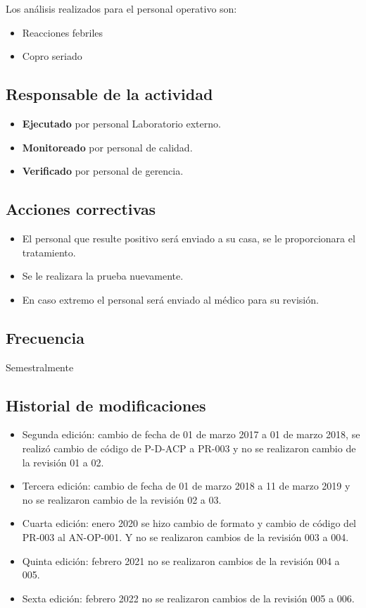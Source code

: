 Los análisis realizados para el personal operativo son:

\begin{itemize}
	\item Reacciones febriles
	\item Copro seriado
\end{itemize}

\subsection{Responsable de la actividad}
\begin{itemize}
	\item \textbf{Ejecutado} por personal Laboratorio externo.
	\item \textbf{Monitoreado} por personal de calidad.
	\item \textbf{Verificado} por personal de gerencia.
\end{itemize}

\subsection{Acciones correctivas}

\begin{itemize}
	\item El personal que resulte positivo será enviado a su casa, se le proporcionara el tratamiento.
	\item Se le realizara la prueba nuevamente.
	\item En caso extremo el personal será enviado al médico para su revisión.
\end{itemize}

\subsection{Frecuencia}
Semestralmente

\subsection{Historial de modificaciones}

\begin{itemize}
	\item Segunda edición: cambio de fecha de 01 de marzo 2017 a 01 de marzo 2018, se realizó cambio de código de P-D-ACP a PR-003 y no se realizaron cambio de la revisión 01 a 02.
	\item Tercera edición: cambio de fecha de 01 de marzo 2018 a 11 de marzo 2019 y no se realizaron cambio de la revisión 02 a 03.
	\item Cuarta edición: enero 2020 se hizo cambio de formato y cambio de código del PR-003 al AN-OP-001. Y no se realizaron cambios de la revisión 003 a 004.
	\item Quinta edición: febrero 2021 no se realizaron cambios de la revisión 004 a 005.
	\item Sexta edición: febrero 2022 no se realizaron cambios de la revisión 005 a 006.
\end{itemize}

